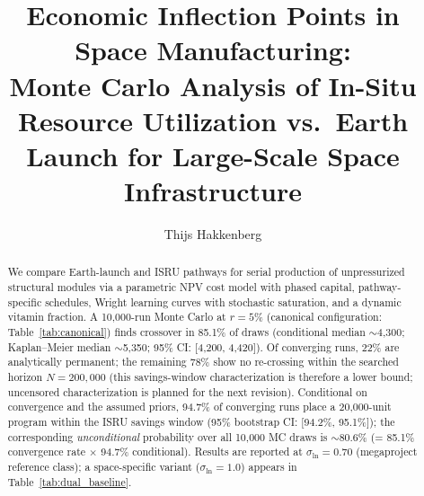 \begin{frontmatter}

\title{Economic Inflection Points in Space Manufacturing:\\ Monte Carlo Analysis of In-Situ Resource Utilization vs.\ Earth Launch for Large-Scale Space Infrastructure}

\author[dyson]{Thijs Hakkenberg}

\address[dyson]{Project Dyson, Open Research Initiative}

\begin{abstract}
We compare Earth-launch and ISRU pathways for serial production of unpressurized structural modules via a parametric NPV cost model with phased capital, pathway-specific schedules, Wright learning curves with stochastic saturation, and a dynamic vitamin fraction. A 10{,}000-run Monte Carlo at $r = 5\%$ (canonical configuration: Table~\ref{tab:canonical}) finds crossover in 85.1\% of draws (conditional median ${\sim}$4{,}300; Kaplan--Meier median ${\sim}$5{,}350; 95\% CI: [4{,}200, 4{,}420]). Of converging runs, 22\% are analytically permanent; the remaining 78\% show no re-crossing within the searched horizon $N = 200{,}000$ (this savings-window characterization is therefore a lower bound; uncensored characterization is planned for the next revision). Conditional on convergence and the assumed priors, 94.7\% of converging runs place a 20{,}000-unit program within the ISRU savings window (95\% bootstrap CI: [94.2\%, 95.1\%]); the corresponding \emph{unconditional} probability over all 10{,}000 MC draws is ${\sim}$80.6\% (= 85.1\% convergence rate $\times$ 94.7\% conditional). Results are reported at $\sigma_{\ln} = 0.70$ (megaproject reference class); a space-specific variant ($\sigma_{\ln} = 1.0$) appears in Table~\ref{tab:dual_baseline}.


\end{abstract}
\end{frontmatter}
